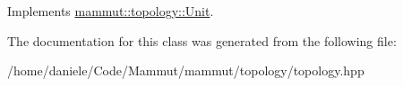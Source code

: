 Implements \hyperlink{classmammut_1_1topology_1_1Unit_a70730dde75533d3f5ecd3d3686df87cc}{mammut\-::topology\-::\-Unit}.



The documentation for this class was generated from the following file\-:\begin{DoxyCompactItemize}
\item 
/home/daniele/\-Code/\-Mammut/mammut/topology/topology.\-hpp\end{DoxyCompactItemize}
